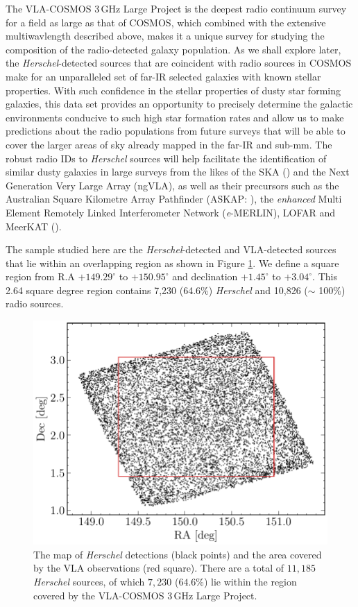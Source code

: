 The VLA-COSMOS 3\,GHz Large Project is the deepest radio continuum survey for a field as large as that of COSMOS, which combined with the extensive multiwavlength described above, makes it a unique survey for studying the composition of the radio-detected galaxy population. As we shall explore later, the \textit{Herschel}-detected sources that are coincident with radio sources in COSMOS make for an unparalleled set of far-IR selected galaxies with known stellar properties. With such confidence in the stellar properties of dusty star forming galaxies, this data set provides an opportunity to precisely determine the galactic environments conducive to such high star formation rates and allow us to make predictions about the radio populations from future surveys that will be able to cover the larger areas of sky already mapped in the far-IR and sub-mm. The robust radio IDs to \textit{Herschel} sources will help facilitate the identification of similar dusty galaxies in large surveys from the likes of the SKA (\citealt{Dewdney_2009}) and the Next Generation Very Large Array (ngVLA), as well as their precursors such as the Australian Square Kilometre Array Pathfinder (ASKAP: \citealt{Johnston_2007}), the \textit{enhanced} Multi Element Remotely Linked Interferometer Network (\textit{e}-MERLIN), LOFAR and MeerKAT (\citealt{Jonas_2009}).

The sample studied here are the \textit{Herschel}-detected and VLA-detected sources that lie within an overlapping region as shown in Figure \ref{fig:sky_map}. We define a square region from R.A $+149.29^{\circ}$ to $+150.95^{\circ}$ and declination $+1.45^{\circ}$ to $+3.04^{\circ}$. This 2.64 square degree region contains 7,230 (64.6\%) \textit{Herschel} and 10,826 ($\sim$ 100\%) radio sources.

\begin{figure}
	\centering
	\includegraphics[width=0.75\columnwidth]{Figures/sky_map.pdf}
	\caption[Map of the \textit{Herschel} and VLA observations in the COSMOS field]{The map of \textit{Herschel} detections (black points) and the area covered by the VLA observations (red square). There are a total of $11,185$ \textit{Herschel} sources, of which $7,230$ ($64.6$\%) lie within the region covered by the VLA-COSMOS $3\,$GHz Large Project.}
	\label{fig:sky_map}
\end{figure}

